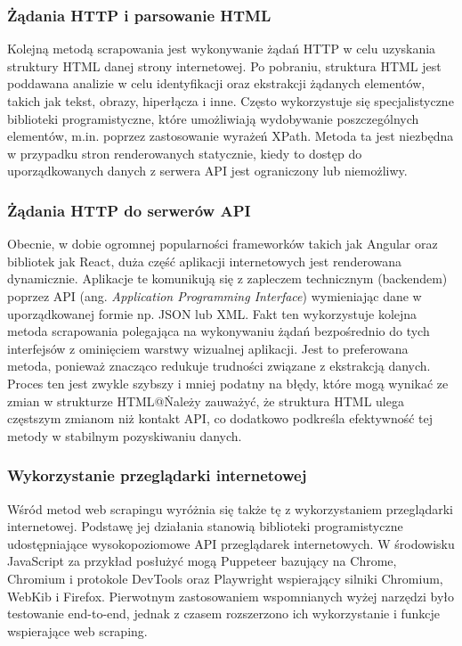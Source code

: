 \subsubsection{Żądania HTTP i parsowanie HTML}

Kolejną metodą scrapowania jest wykonywanie żądań HTTP w celu uzyskania struktury HTML danej strony internetowej.
Po pobraniu, struktura HTML jest poddawana analizie w celu identyfikacji oraz ekstrakcji żądanych elementów, takich jak tekst, obrazy, hiperłącza i inne.
Często wykorzystuje się specjalistyczne biblioteki programistyczne, które umożliwiają wydobywanie poszczególnych elementów, m.in. poprzez zastosowanie wyrażeń XPath.
Metoda ta jest niezbędna w przypadku stron renderowanych statycznie, kiedy to dostęp do uporządkowanych danych z serwera API jest ograniczony lub niemożliwy.

\subsubsection{Żądania HTTP do serwerów API}

Obecnie, w dobie ogromnej popularności frameworków takich jak Angular oraz bibliotek jak React, duża część aplikacji internetowych jest renderowana dynamicznie.
Aplikacje te komunikują się z zapleczem technicznym (backendem) poprzez API (ang. \emph{Application Programming Interface}) wymieniając dane w uporządkowanej formie np. JSON lub XML.
Fakt ten wykorzystuje kolejna metoda scrapowania polegająca na wykonywaniu żądań bezpośrednio do tych interfejsów z ominięciem warstwy wizualnej aplikacji.
Jest to preferowana metoda, ponieważ znacząco redukuje trudności związane z ekstrakcją danych.
Proces ten jest zwykle szybszy i mniej podatny na błędy, które mogą wynikać ze zmian w strukturze HTML@\.
Należy zauważyć, że struktura HTML ulega częstszym zmianom niż kontakt API, co dodatkowo podkreśla efektywność tej metody w stabilnym pozyskiwaniu danych.

\subsubsection{Wykorzystanie przeglądarki internetowej}

Wśród metod web scrapingu wyróżnia się także tę z wykorzystaniem przeglądarki internetowej.
Podstawę jej działania stanowią biblioteki programistyczne udostępniające wysokopoziomowe API przeglądarek internetowych.
W środowisku JavaScript za przykład posłużyć mogą Puppeteer bazujący na Chrome, Chromium i protokole DevTools
oraz Playwright wspierający silniki Chromium, WebKib i Firefox.
Pierwotnym zastosowaniem wspomnianych wyżej narzędzi było testowanie end-to-end, jednak z czasem rozszerzono ich wykorzystanie i funkcje wspierające web scraping.

